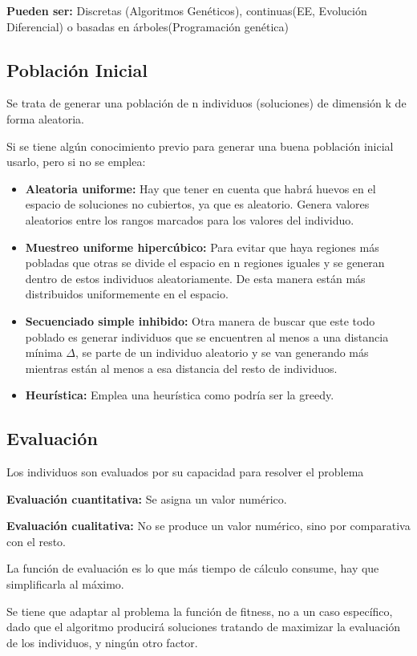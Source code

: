 \documentclass[12pt, twoside, openright]{report} %
\begin{document}
\textbf{Pueden ser:} Discretas (Algoritmos Genéticos), continuas(EE, Evolución Diferencial) o basadas en árboles(Programación genética)

\subsection{Población Inicial}
Se trata de generar una población de n individuos (soluciones) de dimensión k de forma aleatoria.

Si se tiene algún conocimiento previo para generar una buena población inicial usarlo, pero si no se emplea:
\begin{itemize}
	\item \textbf{Aleatoria uniforme:} Hay que tener en cuenta que habrá huevos en el espacio de soluciones no cubiertos, ya que es aleatorio. Genera valores aleatorios entre los rangos marcados para los valores del individuo.
	\item \textbf{Muestreo uniforme hipercúbico:} Para evitar que haya regiones más pobladas que otras se divide el espacio en n regiones iguales y se generan dentro de estos individuos aleatoriamente. De esta manera están más distribuidos uniformemente en el espacio.
	\item \textbf{Secuenciado simple inhibido:} Otra manera de buscar que este todo poblado es generar individuos que se encuentren al menos a una distancia mínima $\Delta$, se parte de un individuo aleatorio y se van generando más mientras están al menos a esa distancia del resto de individuos.
	\item \textbf{Heurística:} Emplea una heurística como podría ser la greedy.
\end{itemize}
\pagebreak

\subsection{Evaluación}
Los individuos son evaluados por su capacidad para resolver el problema

\textbf{Evaluación cuantitativa:} Se asigna un valor numérico.

\textbf{Evaluación cualitativa:} No se produce un valor numérico, sino por comparativa con el resto.

La función de evaluación es lo que más tiempo de cálculo consume, hay que simplificarla al máximo.

Se tiene que adaptar al problema la función de fitness, no a un caso específico, dado que el algoritmo producirá soluciones tratando de maximizar la evaluación de los individuos, y ningún otro factor.
\end{document}
